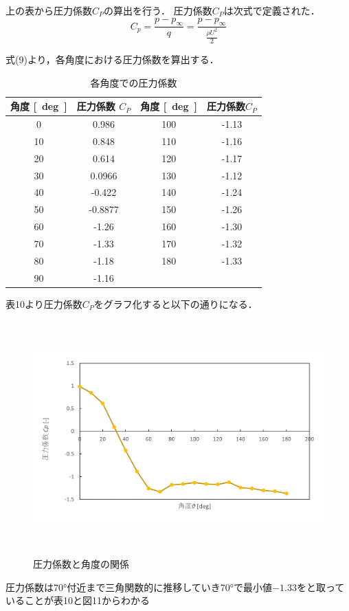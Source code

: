 \documentclass[a4paper,titlepage]{ltjsarticle}
\begin{document}
上の表から圧力係数$C_P$の算出を行う．
圧力係数$C_P$は次式で定義された．
\begin{equation}
  C_p=\frac{p-p_\infty}{q}=\frac{p-p_\infty}{\frac{\rho U^2}{2}}
\end{equation}

式(9)より，各角度における圧力係数を算出する．

\begin{table}[hbtp]
  \caption{各角度での圧力係数}
  \centering
  \begin{tabular}{cccc}
    \toprule
    角度 {\si{[deg]}}& 圧力係数 $C_P$& 角度 {\si{[deg]}}& 圧力係数$C_P$ \\
    \hline
   0 & 0.986& 100 & -1.13\\
   10 & 0.848& 110 & -1.16\\
   20 & 0.614& 120 & -1.17\\
   30 & 0.0966& 130 & -1.12\\
   40 & -0.422& 140 & -1.24\\
   50 & -0.8877& 150 & -1.26\\
   60 & -1.26& 160 & -1.30\\
   70 & -1.33& 170 & -1.32\\
   80 & -1.18& 180 & -1.33\\
   90 & -1.16&  & \\
 \bottomrule
  \end{tabular}
\end{table}

表10より圧力係数$C_P$をグラフ化すると以下の通りになる．
\clearpage

\begin{figure}[hbtp]
  \centering
  \includegraphics[height=9cm,width=15cm]{圧力係数.png}
  \caption{圧力係数と角度の関係}
  \label{圧力係数}
\end{figure}
圧力係数は$\ang{70}$付近まで三角関数的に推移していき\ang{70}で最小値$-1.33$をと取っていることが表10と図11からわかる
\end{document}
